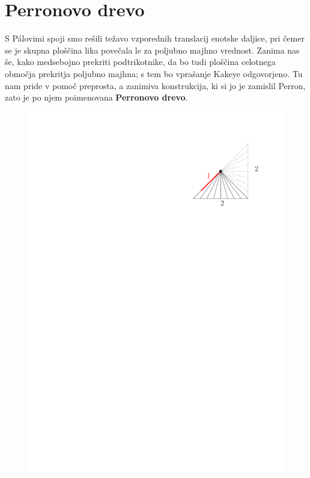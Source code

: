 \documentclass[a4paper, 12pt]{article}
\begin{document}

\section*{Perronovo drevo}

S Pálovimi spoji smo rešili težavo vzporednih translacij enotske daljice, pri čemer se je skupna ploščina lika povečala le za poljubno majhno vrednost. Zanima nas še, kako medsebojno prekriti podtrikotnike, da bo tudi ploščina celotnega območja prekritja poljubno majhna; s tem bo vprašanje Kakeye odgovorjeno. Tu nam pride v pomoč preprosta, a zanimiva konstrukcija, ki si jo je zamislil Perron, zato je po njem poimenovana \textbf{Perronovo drevo}.

\begin{figure}
    \includegraphics[width=0.9\linewidth]{ipe_slike/polovica_trikotnika.pdf}
\end{figure}
\end{document}
